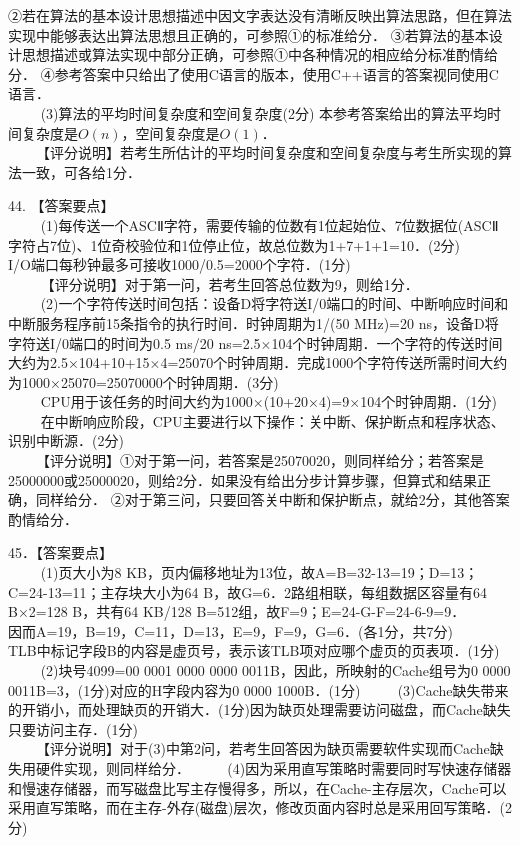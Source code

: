 ②若在算法的基本设计思想描述中因文字表达没有清晰反映出算法思路，但在算法实现中能够表达出算法思想且正确的，可参照①的标准给分．
③若算法的基本设计思想描述或算法实现中部分正确，可参照①中各种情况的相应给分标准酌情给分．
④参考答案中只给出了使用C语言的版本，使用C++语言的答案视同使用C语言． \\
$\qquad$ (3)算法的平均时间复杂度和空间复杂度(2分)
本参考答案给出的算法平均时间复杂度是$O(n)$，空间复杂度是$O(1)$． \\
$\qquad$【评分说明】若考生所估计的平均时间复杂度和空间复杂度与考生所实现的算法一致，可各给1分．

44. 【答案要点】 \\
$\qquad$ (1)每传送一个ASCⅡ字符，需要传输的位数有1位起始位、7位数据位(ASCⅡ字符占7位)、1位奇校验位和1位停止位，故总位数为1+7+1+1=10．(2分) \\
I/O端口每秒钟最多可接收1000/0.5=2000个字符．(1分) \\
$\qquad$ 【评分说明】对于第一问，若考生回答总位数为9，则给1分． \\
$\qquad$ (2)一个字符传送时间包括：设备D将字符送I/0端口的时间、中断响应时间和中断服务程序前15条指令的执行时间．时钟周期为1/(50 MHz)=20 ns，设备D将字符送I/0端口的时间为0.5 ms/20 ns=2.5×104个时钟周期．一个字符的传送时间大约为2.5×104+10+15×4=25070个时钟周期．完成1000个字符传送所需时间大约为1000×25070=25070000个时钟周期．(3分) \\
$\qquad$ CPU用于该任务的时间大约为1000×(10+20×4)=9×104个时钟周期．(1分) \\
$\qquad$ 在中断响应阶段，CPU主要进行以下操作：关中断、保护断点和程序状态、识别中断源．(2分) \\
$\qquad$【评分说明】①对于第一问，若答案是25070020，则同样给分；若答案是25000000或25000020，则给2分．如果没有给出分步计算步骤，但算式和结果正确，同样给分． 
②对于第三问，只要回答关中断和保护断点，就给2分，其他答案酌情给分．

45．【答案要点】 \\
$\qquad$ (1)页大小为8 KB，页内偏移地址为13位，故A=B=32-13=19；D=13；C=24-13=11；主存块大小为64 B，故G=6．2路组相联，每组数据区容量有64 B×2=128 B，共有64 KB/128 B=512组，故F=9；E=24-G-F=24-6-9=9． \\
因而A=19，B=19，C=11，D=13，E=9，F=9，G=6．(各1分，共7分) \\
TLB中标记字段B的内容是虚页号，表示该TLB项对应哪个虚页的页表项．(1分) \\
$\qquad$ (2)块号4099=00 0001 0000 0000 0011B，因此，所映射的Cache组号为0 0000 0011B=3，(1分)对应的H字段内容为0 0000 1000B．(1分)
$\qquad$ (3)Cache缺失带来的开销小，而处理缺页的开销大．(1分)因为缺页处理需要访问磁盘，而Cache缺失只要访问主存．(1分) \\
$\qquad$【评分说明】对于(3)中第2问，若考生回答因为缺页需要软件实现而Cache缺失用硬件实现，则同样给分．
$\qquad$ (4)因为采用直写策略时需要同时写快速存储器和慢速存储器，而写磁盘比写主存慢得多，所以，在Cache-主存层次，Cache可以采用直写策略，而在主存-外存(磁盘)层次，修改页面内容时总是采用回写策略．(2分)

